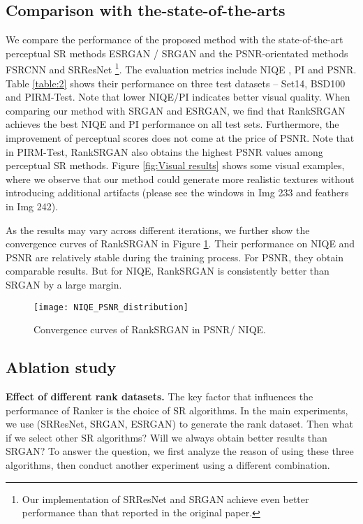 \documentclass[10pt,twocolumn,letterpaper]{article}
\begin{document}
\subsection{Comparison with the-state-of-the-arts}
\label{section4.3}
We compare the performance of the proposed method with the state-of-the-art perceptual SR methods ESRGAN \cite{Wang_2018_ECCV_Workshops}/ SRGAN \cite{ledig2017photo} and the PSNR-orientated methods FSRCNN \cite{dong2016accelerating} and SRResNet \cite{ledig2017photo} \footnote{Our implementation of SRResNet and SRGAN achieve even better performance than that reported in the original paper.}. The evaluation metrics include NIQE \cite{mittal2013making}, PI \cite{blau20182018} and PSNR. Table \ref{table:2} shows their performance on three test datasets -- Set14, BSD100 and PIRM-Test. Note that lower NIQE/PI indicates better visual quality. When comparing our method with SRGAN and ESRGAN, we find that RankSRGAN achieves the best NIQE and PI performance on all test sets. Furthermore, the improvement of perceptual scores does not come at the price of PSNR. Note that in PIRM-Test, RankSRGAN also obtains the highest PSNR values among perceptual SR methods. Figure \ref{fig:Visual results} shows some visual examples, where we observe that our method could generate more realistic textures without introducing additional artifacts (please see the windows in Img 233 and feathers in Img 242). 

As the results may vary across different iterations, we further show the convergence curves of RankSRGAN in Figure \ref{fig:curve}. Their performance on NIQE and PSNR are relatively stable during the training process. For PSNR, they obtain comparable results. But for NIQE, RankSRGAN is consistently better than SRGAN by a large margin. 

\begin{figure}[t]
\setlength{\abovecaptionskip}{-0.4cm}
\setlength{\belowcaptionskip}{-0.5cm}
\begin{center}
	\texttt{[image: NIQE\_PSNR\_distribution]} 

\end{center}
   \caption{Convergence curves of RankSRGAN in PSNR/ NIQE.}
\label{fig:curve}
\end{figure}

\subsection{Ablation study}
\label{section4.5}
\textbf{Effect of different rank datasets.} The key factor that influences the performance of Ranker is the choice of SR algorithms. In the main experiments, we use (SRResNet, SRGAN, ESRGAN) to generate the rank dataset. Then what if we select other SR algorithms? Will we always obtain better results than SRGAN? To answer the question, we first analyze the reason of using these three algorithms, then conduct another experiment using a different combination. 
\end{document}

